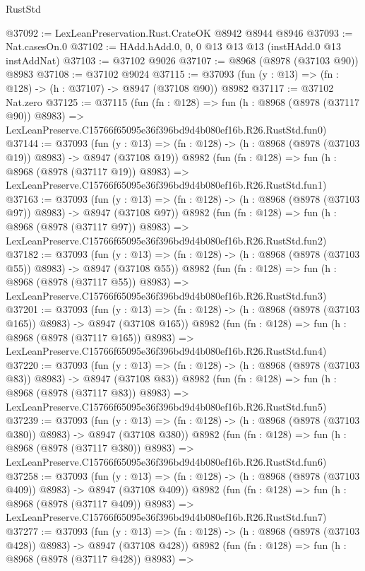 \begin{lexlean}{RustStd}
\begin{coremodule}
@37092 := LexLeanPreservation.Rust.CrateOK @8942 @8944 @8946
@37093 := Nat.casesOn.{0}
@37102 := HAdd.hAdd.{0, 0, 0} @13 @13 @13 (instHAdd.{0} @13 instAddNat)
@37103 := @37102 @9026
@37107 := @8968 (@8978 (@37103 @90)) @8983
@37108 := @37102 @9024
@37115 := @37093 (fun (y : @13) => (fn : @128) -> (h : @37107) -> @8947 (@37108 @90)) @8982
@37117 := @37102 Nat.zero
@37125 := @37115
    (fun (fn : @128) =>
    fun (h : @8968 (@8978 (@37117 @90)) @8983) =>
    LexLeanPreserve.C15766f65095e36f396bd9d4b080ef16b.R26.RustStd.fun0)
@37144 := @37093
    (fun (y : @13) => (fn : @128) -> (h : @8968 (@8978 (@37103 @19)) @8983) -> @8947 (@37108 @19))
    @8982
    (fun (fn : @128) =>
    fun (h : @8968 (@8978 (@37117 @19)) @8983) =>
    LexLeanPreserve.C15766f65095e36f396bd9d4b080ef16b.R26.RustStd.fun1)
@37163 := @37093
    (fun (y : @13) => (fn : @128) -> (h : @8968 (@8978 (@37103 @97)) @8983) -> @8947 (@37108 @97))
    @8982
    (fun (fn : @128) =>
    fun (h : @8968 (@8978 (@37117 @97)) @8983) =>
    LexLeanPreserve.C15766f65095e36f396bd9d4b080ef16b.R26.RustStd.fun2)
@37182 := @37093
    (fun (y : @13) => (fn : @128) -> (h : @8968 (@8978 (@37103 @55)) @8983) -> @8947 (@37108 @55))
    @8982
    (fun (fn : @128) =>
    fun (h : @8968 (@8978 (@37117 @55)) @8983) =>
    LexLeanPreserve.C15766f65095e36f396bd9d4b080ef16b.R26.RustStd.fun3)
@37201 := @37093
    (fun (y : @13) => (fn : @128) -> (h : @8968 (@8978 (@37103 @165)) @8983) -> @8947 (@37108 @165))
    @8982
    (fun (fn : @128) =>
    fun (h : @8968 (@8978 (@37117 @165)) @8983) =>
    LexLeanPreserve.C15766f65095e36f396bd9d4b080ef16b.R26.RustStd.fun4)
@37220 := @37093
    (fun (y : @13) => (fn : @128) -> (h : @8968 (@8978 (@37103 @83)) @8983) -> @8947 (@37108 @83))
    @8982
    (fun (fn : @128) =>
    fun (h : @8968 (@8978 (@37117 @83)) @8983) =>
    LexLeanPreserve.C15766f65095e36f396bd9d4b080ef16b.R26.RustStd.fun5)
@37239 := @37093
    (fun (y : @13) => (fn : @128) -> (h : @8968 (@8978 (@37103 @380)) @8983) -> @8947 (@37108 @380))
    @8982
    (fun (fn : @128) =>
    fun (h : @8968 (@8978 (@37117 @380)) @8983) =>
    LexLeanPreserve.C15766f65095e36f396bd9d4b080ef16b.R26.RustStd.fun6)
@37258 := @37093
    (fun (y : @13) => (fn : @128) -> (h : @8968 (@8978 (@37103 @409)) @8983) -> @8947 (@37108 @409))
    @8982
    (fun (fn : @128) =>
    fun (h : @8968 (@8978 (@37117 @409)) @8983) =>
    LexLeanPreserve.C15766f65095e36f396bd9d4b080ef16b.R26.RustStd.fun7)
@37277 := @37093
    (fun (y : @13) => (fn : @128) -> (h : @8968 (@8978 (@37103 @428)) @8983) -> @8947 (@37108 @428))
    @8982
    (fun (fn : @128) =>
    fun (h : @8968 (@8978 (@37117 @428)) @8983) =>

\end{coremodule}
\end{lexlean}
